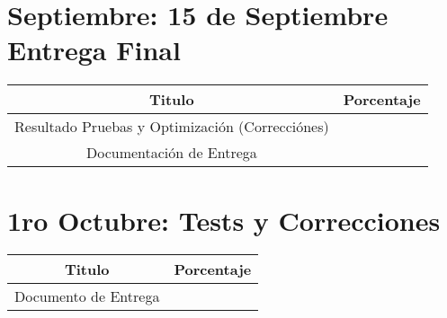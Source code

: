 \section{Septiembre: 15 de Septiembre Entrega Final}

\begin{center}
\begin{tabular}{|c|c|}
\hline 
Titulo & Porcentaje \\ \hline
\hline
Resultado Pruebas y Optimización (Correcciónes) & \\ \hline
Documentación de Entrega & \\ \hline
\end{tabular}
\end{center}

\section{1ro Octubre: Tests y Correcciones}

\begin{center}
\begin{tabular}{|c|c|}
\hline 
Titulo & Porcentaje \\ \hline
\hline
Documento de Entrega & \\ \hline
\end{tabular}
\end{center}